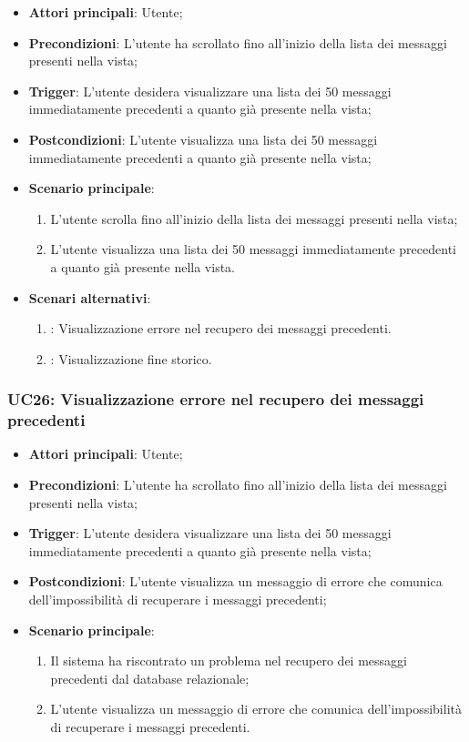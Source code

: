 \begin{itemize}
    \item \textbf{Attori principali}: Utente;
    \item \textbf{Precondizioni}: L'utente ha scrollato fino all'inizio della lista dei messaggi presenti nella vista;
    \item \textbf{Trigger}: L'utente desidera visualizzare una lista dei 50 messaggi immediatamente precedenti a quanto già presente nella vista;
    \item \textbf{Postcondizioni}: L'utente visualizza una lista dei 50 messaggi immediatamente precedenti a quanto già presente nella vista;
    \item \textbf{Scenario principale}:
    \begin{enumerate}
        \item L'utente scrolla fino all'inizio della lista dei messaggi presenti nella vista;
        \item L'utente visualizza una lista dei 50 messaggi immediatamente precedenti a quanto già presente nella vista.
    \end{enumerate}
    \item \textbf{Scenari alternativi}:
    \begin{enumerate}
        \item {}: Visualizzazione errore nel recupero dei messaggi precedenti.
        \item {}: Visualizzazione fine storico.
    \end{enumerate}
\end{itemize}

\hypertarget{UC26}{}
\subsubsection{UC26: Visualizzazione errore nel recupero dei messaggi precedenti}
\begin{itemize}
    \item \textbf{Attori principali}: Utente;
    \item \textbf{Precondizioni}: L'utente ha scrollato fino all'inizio della lista dei messaggi presenti nella vista;
    \item \textbf{Trigger}: L'utente desidera visualizzare una lista dei 50 messaggi immediatamente precedenti a quanto già presente nella vista;
    \item \textbf{Postcondizioni}: L'utente visualizza un messaggio di errore che comunica dell'impossibilità di recuperare i messaggi precedenti;
    \item \textbf{Scenario principale}: 
    \begin{enumerate}
        \item Il sistema ha riscontrato un problema nel recupero dei messaggi precedenti dal database relazionale;
        \item L'utente visualizza un messaggio di errore che comunica dell'impossibilità di recuperare i messaggi precedenti.
    \end{enumerate}
\end{itemize}